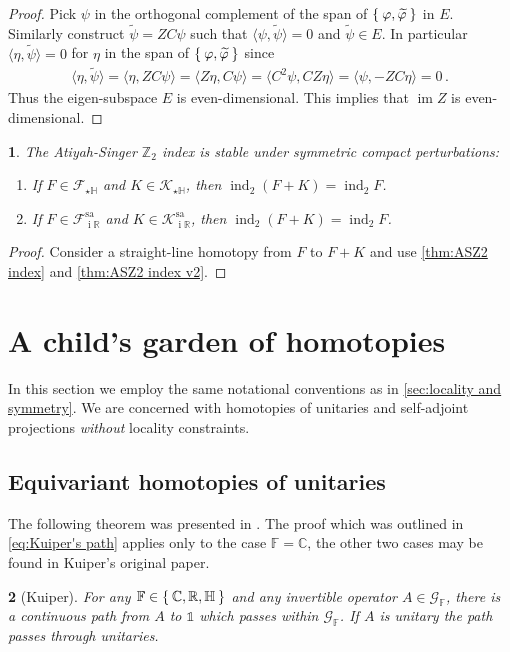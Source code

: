 \documentclass[a4paper,10pt]{article}
\numberwithin{equation}{section}
\theoremstyle{plain}
\newtheorem{thm}{\protect\theoremname}[section]
\theoremstyle{plain}
\theoremstyle{plain}
\newtheorem{cor}[thm]{\protect\corollaryname}
\theoremstyle{plain}
\theoremstyle{plain}
\theoremstyle{remark}
\theoremstyle{definition}
\theoremstyle{plain}
\providecommand{\corollaryname}{Corollary}
\providecommand{\theoremname}{Theorem}
\newcommand{\ii}{\operatorname{i}}
\newcommand{\ZZ}{\mathbb{Z}}
\newcommand{\RR}{\mathbb{R}}
\newcommand{\CC}{\mathbb{C}}
\newcommand{\FF}{\mathbb{F}}
\newcommand{\calF}{\mathcal{F}}
\newcommand{\calG}{\mathcal{G}}
\newcommand{\calK}{\mathcal{K}}
\newcommand{\ip}[2]{\langle #1, #2 \rangle}
\newcommand{\vf}{\varphi}
\newcommand{\Id}{\mathds{1}}
\newcommand{\HH}{\mathbb{H}}
\newcommand{\findex}{\operatorname{ind}}
\newcommand{\im}{\operatorname{im}}
\newcommand{\eq}[1]{\begin{align*}#1\end{align*}}
\newcommand{\Schur}{Z}
\begin{document}
\begin{proof}
		Pick $\psi$ in the orthogonal complement of the span of $\Set{\vf,\widetilde{\vf}}$ in $E$. 
		Similarly construct $\widetilde{\psi}=\Schur C\psi$ such that $\ip{\psi}{\widetilde{\psi}}=0$ and $\widetilde{\psi}\in E$. In particular $\ip{\eta}{\widetilde{\psi}}=0$ for $\eta$ in the span of $\Set{\vf,\widetilde{\vf}}$ since \eq{\ip{\eta}{\widetilde{\psi}}=\ip{\eta}{\Schur C\psi}=\ip{\Schur\eta}{C\psi}=\ip{C^2\psi}{C\Schur\eta}=\ip{\psi}{-\Schur C\eta}=0\,.} 
		Thus the eigen-subspace $E$ is even-dimensional. This implies that $\im \Schur$ is even-dimensional.
	\end{proof}
	
	\begin{cor}\label{cor:compact perturbation preserve Z2 index} The Atiyah-Singer $\ZZ_2$ index is stable under symmetric compact perturbations:
		\begin{enumerate}
			\item If $F\in \calF_{\star\HH}$ and $K\in\calK_{\star\HH}$, then $\findex_2 (F+K)= \findex_2 F $.
			\item If $F\in\calF_{\ii\RR}^{\mathrm{sa}}$ and $K\in\calK_{\ii\RR}^{\mathrm{sa}}$, then $\findex_2(F+K)=\findex_2 F$.
		\end{enumerate}
	\end{cor}
	\begin{proof}
		Consider a straight-line homotopy from $F$ to $F+K$ and use \cref{thm:ASZ2 index} and \cref{thm:ASZ2 index v2}.
	\end{proof}
	
	\section{A child's garden of homotopies}
	In this section we employ the same notational conventions as in \cref{sec:locality and symmetry}. We are concerned with homotopies of unitaries and self-adjoint projections \emph{without} locality constraints. 
	\subsection{Equivariant homotopies of unitaries}
	The following theorem was presented in \cite{Kuiper1965}. The proof which was outlined in \cref{eq:Kuiper's path} applies only to the case $\FF=\CC$, the other two cases may be found in Kuiper's original paper.
	\begin{thm}[Kuiper]\label{thm:Kuiper} For any $\FF\in\Set{\CC,\RR,\HH}$ and any invertible operator $A\in\calG_\FF$, there is a continuous path from $A$ to $\Id$ which passes within $\calG_\FF$. If $A$ is unitary the path passes through unitaries.
	\end{thm}
	
\end{document}
